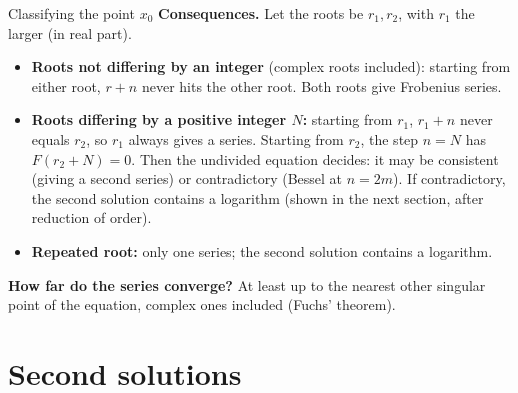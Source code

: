 \documentclass[11pt]{beamer}
\begin{document}
\begin{frame}[allowframebreaks=1.00]{Classifying the point $x_0$}
\textbf{Consequences.} Let the roots be \(r_1,r_2\), with \(r_1\) the larger (in real part).
\begin{itemize}
 \item \textbf{Roots not differing by an integer} (complex roots included): starting from either
       root, \(r+n\) never hits the other root. Both roots give Frobenius series.
 \item \textbf{Roots differing by a positive integer \(N\):} starting from \(r_1\), \(r_1+n\) never equals
       \(r_2\), so \(r_1\) always gives a series. Starting from \(r_2\), the step \(n=N\) has \(F(r_2+N)=0\). Then
       the undivided equation decides: it may be consistent (giving a second series) or contradictory (Bessel at \(n=2m\)). If contradictory, the second solution contains
       a logarithm (shown in the next section, after reduction of order).
 \item \textbf{Repeated root:} only one series; the second solution contains a logarithm.
\end{itemize}
\textbf{How far do the series converge?} At least up to the nearest other singular point of the
equation, complex ones included (Fuchs' theorem).
\end{frame}




\section{Second solutions}
\end{document}
